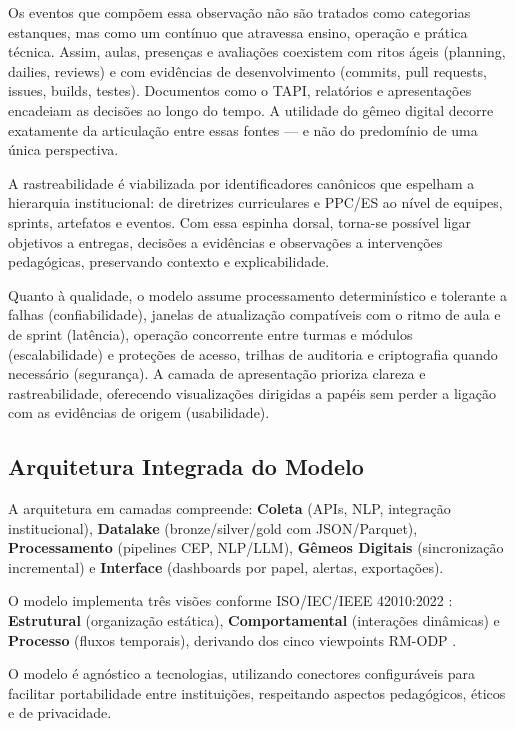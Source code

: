 \documentclass[12pt,a4paper]{article}
\begin{document}
Os eventos que compõem essa observação não são tratados como categorias estanques, mas como um contínuo que atravessa ensino, operação e prática técnica. Assim, aulas, presenças e avaliações coexistem com ritos ágeis (planning, dailies, reviews) e com evidências de desenvolvimento (commits, pull requests, issues, builds, testes). Documentos como o TAPI, relatórios e apresentações encadeiam as decisões ao longo do tempo. A utilidade do gêmeo digital decorre exatamente da articulação entre essas fontes — e não do predomínio de uma única perspectiva.

A rastreabilidade é viabilizada por identificadores canônicos que espelham a hierarquia institucional: de diretrizes curriculares e PPC/ES ao nível de equipes, sprints, artefatos e eventos. Com essa espinha dorsal, torna-se possível ligar objetivos a entregas, decisões a evidências e observações a intervenções pedagógicas, preservando contexto e explicabilidade.

Quanto à qualidade, o modelo assume processamento determinístico e tolerante a falhas (confiabilidade), janelas de atualização compatíveis com o ritmo de aula e de sprint (latência), operação concorrente entre turmas e módulos (escalabilidade) e proteções de acesso, trilhas de auditoria e criptografia quando necessário (segurança). A camada de apresentação prioriza clareza e rastreabilidade, oferecendo visualizações dirigidas a papéis sem perder a ligação com as evidências de origem (usabilidade).



\subsection{Arquitetura Integrada do Modelo}

A arquitetura em camadas compreende: \textbf{Coleta} (APIs, NLP, integração institucional), \textbf{Datalake} (bronze/silver/gold com JSON/Parquet), \textbf{Processamento} (pipelines CEP, NLP/LLM), \textbf{Gêmeos Digitais} (sincronização incremental) e \textbf{Interface} (dashboards por papel, alertas, exportações).

O modelo implementa três visões conforme ISO/IEC/IEEE 42010:2022 \cite{iso42010}: \textbf{Estrutural} (organização estática), \textbf{Comportamental} (interações dinâmicas) e \textbf{Processo} (fluxos temporais), derivando dos cinco viewpoints RM-ODP \cite{iso10746}.

O modelo é agnóstico a tecnologias, utilizando conectores configuráveis para facilitar portabilidade entre instituições, respeitando aspectos pedagógicos, éticos e de privacidade.
\end{document}
